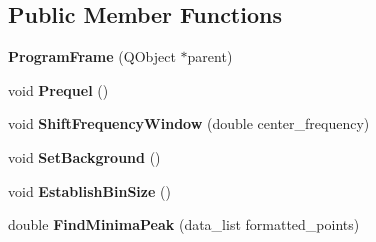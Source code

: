 \subsection*{Public Member Functions}
\begin{DoxyCompactItemize}
\item 
{\bfseries Program\+Frame} (Q\+Object $\ast$parent)\hypertarget{classetig_1_1_program_frame_a69871d3d3ee8ca09985eea46ab2df1de}{}\label{classetig_1_1_program_frame_a69871d3d3ee8ca09985eea46ab2df1de}

\item 
void {\bfseries Prequel} ()\hypertarget{classetig_1_1_program_frame_a2da29d05f66287788c42ba5ba28e5b9b}{}\label{classetig_1_1_program_frame_a2da29d05f66287788c42ba5ba28e5b9b}

\item 
void {\bfseries Shift\+Frequency\+Window} (double center\+\_\+frequency)\hypertarget{classetig_1_1_program_frame_a4b5a587570c2dbad42af57575b395bbb}{}\label{classetig_1_1_program_frame_a4b5a587570c2dbad42af57575b395bbb}

\item 
void {\bfseries Set\+Background} ()\hypertarget{classetig_1_1_program_frame_af41867166a0bc9c5f488107595fedb13}{}\label{classetig_1_1_program_frame_af41867166a0bc9c5f488107595fedb13}

\item 
void {\bfseries Establish\+Bin\+Size} ()\hypertarget{classetig_1_1_program_frame_a04305476dafab8c721d7b8eb41549239}{}\label{classetig_1_1_program_frame_a04305476dafab8c721d7b8eb41549239}

\item 
double {\bfseries Find\+Minima\+Peak} (data\+\_\+list formatted\+\_\+points)\hypertarget{classetig_1_1_program_frame_a72eedcd0f69f164ab687f8244a3ec530}{}\label{classetig_1_1_program_frame_a72eedcd0f69f164ab687f8244a3ec530}

\end{DoxyCompactItemize}
